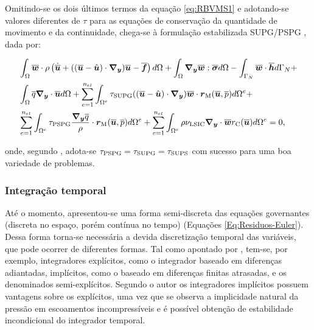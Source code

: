 Omitindo-se os dois últimos termos da equação \eqref{eq:RBVMS1} e adotando-se valores diferentes de $\tau$ para as equações de conservação da quantidade de movimento e da continuidade, chega-se à formulação estabilizada SUPG/PSPG \cite{tezduyar2000finite,tezduyar2003computation,catabriga2005compressible,catabriga2006compressible}, dada por:

\begin{equation}
    \begin{split}
        &\int_{\Omega}{\overline{\boldsymbol{w}}\cdot\rho\left({\dot{\overline{\boldsymbol{u}}}+((\overline{\boldsymbol{u}}-\hat{\boldsymbol{u}})\cdot\boldsymbol{\nabla_y})\overline{\boldsymbol{u}}-\overline{\boldsymbol{f}}}\right) d\Omega}+\int_{\Omega}{\boldsymbol{\nabla_y}\overline{\boldsymbol{w}}:\overline{\boldsymbol{\sigma}} d\Omega}-\int_{\Gamma_N}{\overline{\boldsymbol{w}}\cdot\overline{\boldsymbol{h}} d\Gamma_N}+\\
        &\int_{\Omega}{\overline{q}\boldsymbol{\nabla_y}\cdot\overline{\boldsymbol{u}} d\Omega}+\sum_{e=1}^{n_{el}}{\int_{\Omega^e}{\tau_{\mathrm{SUPG}}((\overline{\boldsymbol{u}}-\hat{\boldsymbol{u}})\cdot\boldsymbol{\nabla_y})\overline{\boldsymbol{w}}\cdot\boldsymbol{r}_\mathrm{M}(\overline{\boldsymbol{u}},\overline{p}) d\Omega^e}}+\\
        &\sum_{e=1}^{n_{el}}{\int_{\Omega^e}{\tau_{\mathrm{PSPG}}\frac{\boldsymbol{\nabla_y}\overline{q}}{\rho}\cdot\boldsymbol{r}_\mathrm{M}(\overline{\boldsymbol{u}},\overline{p}) d\Omega^e}}+\sum_{e=1}^{n_{el}}{\int_{\Omega^e}{\rho\nu_{\mathrm{LSIC}}\boldsymbol{\nabla_y}\cdot\overline{\boldsymbol{w}}r_\mathrm{C}(\overline{\boldsymbol{u}}) d\Omega^e}}=0
        \text{,}
        \label{eq:SUPG-PSPG}
    \end{split}
\end{equation}

\noindent onde, segundo , adota-se $\tau_{\mathrm{PSPG}}=\tau_{\mathrm{SUPG}}=\tau_{\mathrm{SUPS}}$ com sucesso para uma boa variedade de problemas.

\subsubsection{Integração temporal} \label{IT-VMS}

Até o momento, apresentou-se uma forma semi-discreta das equações governantes (discreta no espaço, porém contínua no tempo) (Equações \eqref{Eq:Residuos-Euler}). Dessa forma torna-se necessária a devida discretização temporal das variáveis, que pode ocorrer de diferentes formas. Tal como apontado por , tem-se, por exemplo, integradores explícitos, como o integrador baseado em diferenças adiantadas, implícitos, como o baseado em diferenças finitas atrasadas, e os denominados semi-explícitos. Segundo o autor os integradores implícitos possuem vantagens sobre os explícitos, uma vez que se observa a implicidade natural da pressão em escoamentos incompressíveis e é possível obtenção de estabilidade incondicional do integrador temporal.

